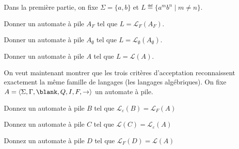 
\begingroup

\begin{exercice}\label{exo:parsing/pushdown/challenge}

  Dans la première partie, on fixe $\Sigma=\{a,b\}$ et $L \eqdef \{a^m b^n \mid m\neq n\}$.
  \begin{questions}
  \item Donner un automate à pile $A_F$ tel que $L = \mathcal{L}_F(A_F)$. 
  \item Donner un automate à pile $A_\emptyset$ tel que $L = \mathcal{L}_\emptyset(A_\emptyset)$. 
  \item Donner un automate à pile $A$ tel que $L = \mathcal{L}(A)$. 
  \end{questions}

  On veut maintenant montrer que les trois critères d'acceptation
  reconnaissent exactement la même famille de langages (les langages algébriques).
  On fixe $A = \langle \Sigma, \Gamma, \blank, Q, I, F, \rightarrow \rangle$ un automate à pile.
  \begin{questions}
  \item Donnez un automate à pile $B$ tel que $\mathcal{L}_\varepsilon(B) = \mathcal{L}_F(A)$
  \item Donnez un automate à pile $C$ tel que $\mathcal{L}(C) = \mathcal{L}_\varepsilon(A)$
  \item Donnez un automate à pile $D$ tel que $\mathcal{L}_F(D) = \mathcal{L}(A)$
  \end{questions}

\end{exercice}

